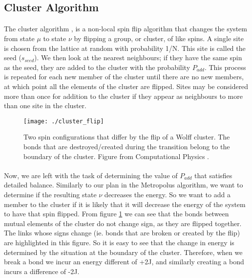 \documentclass[12pt] {report} %
\begin{document}
			
			\subsection{Cluster Algorithm}
			
				\paragraph{}
					The cluster algorithm \cite{wolff_cluster}, is a non-local spin flip algorithm that changes the system from state $\mu$ to state $\nu$ by flipping a group, or cluster, of like spins. A single site is chosen from the lattice at random with probability 1/N. This site is called the seed ($s_{seed}$). We then look at the nearest neighbours; if they have the same spin as the seed, they are added to the cluster with the probability $P_{add}$. This process is repeated for each new member of the cluster until there are no new members, at which point all the elements of the cluster are flipped. Sites may be considered more than once for addition to the cluster if they appear as neighbours to more than one site in the cluster.
					
				\begin{figure}[H]
					\centering
					\texttt{[image: ./cluster\_flip]}
					\caption{Two spin configurations that differ by the flip of a Wolff cluster. The
					bonds that are destroyed/created during the transition belong to the boundary of the
					cluster. Figure from Computational Physics \cite{anagnostopoulos}.}
					\label{fig:cluster_flip}
				\end{figure} 
				
				\paragraph{}
					Now, we are left with the task of determining the value of $P_{add}$ that satisfies detailed balance. Similarly to our plan in the Metropolus algorithm, we want to determine if the resulting state $\nu$ decreases the energy. So we want to add a member to the cluster if it is likely that it will decrease the energy of the system to have that spin flipped. From figure \ref{fig:cluster_flip} we can see that the bonds between mutual elements of the cluster do not change sign, as they are flipped together. The links whose signs change (ie. bonds that are broken or created by the flip) are highlighted in this figure. So it is easy to see that the change in energy is determined by the situation at the boundary of the cluster. Therefore, when we break a bond we incur an energy different of +2J, and similarly creating a bond incurs a difference of -2J.
					
\end{document}
